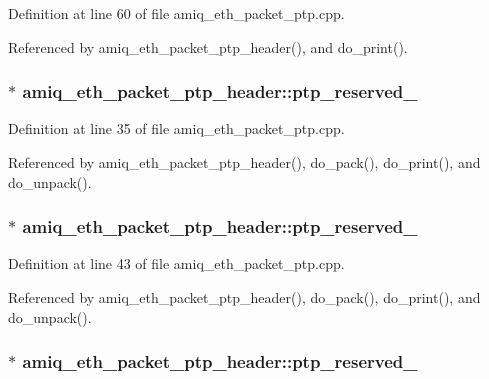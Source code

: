 Definition at line 60 of file amiq\_\-eth\_\-packet\_\-ptp.cpp.

Referenced by amiq\_\-eth\_\-packet\_\-ptp\_\-header(), and do\_\-print().\hypertarget{classamiq__eth__packet__ptp__header_a761cd2dccbba318c56f98137da6de429}{
\subsubsection[{ptp\_\-reserved\_\-1}]{$\ast$ {\bf amiq\_\-eth\_\-packet\_\-ptp\_\-header::ptp\_\-reserved\_}}}
\label{classamiq__eth__packet__ptp__header_a761cd2dccbba318c56f98137da6de429}


Definition at line 35 of file amiq\_\-eth\_\-packet\_\-ptp.cpp.

Referenced by amiq\_\-eth\_\-packet\_\-ptp\_\-header(), do\_\-pack(), do\_\-print(), and do\_\-unpack().\hypertarget{classamiq__eth__packet__ptp__header_a990527bd407cce0280f9003dad5dcd78}{
\subsubsection[{ptp\_\-reserved\_\-2}]{$\ast$ {\bf amiq\_\-eth\_\-packet\_\-ptp\_\-header::ptp\_\-reserved\_}}}
\label{classamiq__eth__packet__ptp__header_a990527bd407cce0280f9003dad5dcd78}


Definition at line 43 of file amiq\_\-eth\_\-packet\_\-ptp.cpp.

Referenced by amiq\_\-eth\_\-packet\_\-ptp\_\-header(), do\_\-pack(), do\_\-print(), and do\_\-unpack().\hypertarget{classamiq__eth__packet__ptp__header_a1aa9a91e12f4b734de610092f8abd6cb}{
\subsubsection[{ptp\_\-reserved\_\-3}]{$\ast$ {\bf amiq\_\-eth\_\-packet\_\-ptp\_\-header::ptp\_\-reserved\_}}}
\label{classamiq__eth__packet__ptp__header_a1aa9a91e12f4b734de610092f8abd6cb}


